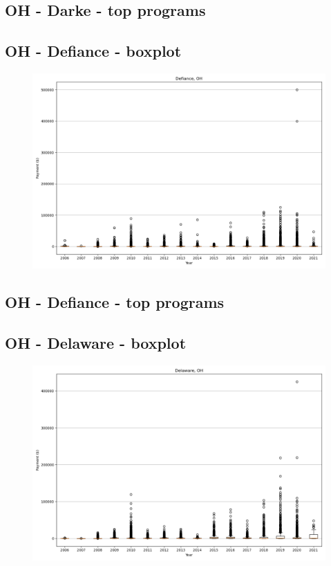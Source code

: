 \subsection*{OH - Darke - top programs}

\newpage
\subsection*{OH - Defiance - boxplot}
\begin{figure}[h]
\centering
\includegraphics[width=7in]{../output/boxplots/counties/Defiance-OH_boxplot.png}
\end{figure}


\subsection*{OH - Defiance - top programs}

\newpage
\subsection*{OH - Delaware - boxplot}
\begin{figure}[h]
\centering
\includegraphics[width=7in]{../output/boxplots/counties/Delaware-OH_boxplot.png}
\end{figure}


